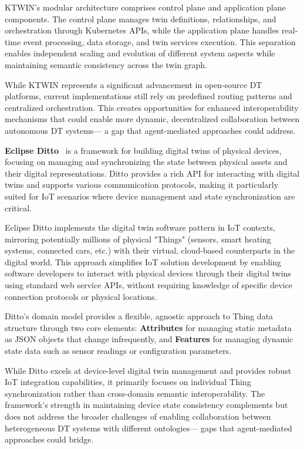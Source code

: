 KTWIN's modular architecture comprises control plane and application plane components.
The control plane manages twin definitions, relationships, and orchestration through Kubernetes APIs,
    while the application plane handles real-time event processing, data storage, and twin services execution.
This separation enables independent scaling and evolution of different system aspects while 
    maintaining semantic consistency across the twin graph.

While KTWIN represents a significant advancement in open-source DT platforms,
    current implementations still rely on predefined routing patterns and centralized orchestration.
This creates opportunities for enhanced interoperability mechanisms that could enable
    more dynamic, decentralized collaboration between autonomous DT systems—
    a gap that agent-mediated approaches could address.

\textbf{Eclipse Ditto}~\cite{eclipseEclipseDittoOpen2025}
    is a framework for building digital twins of physical devices,
    focusing on managing and synchronizing the state between physical assets and their digital representations.
Ditto provides a rich API for interacting with digital twins and supports various communication protocols,
    making it particularly suited for IoT scenarios where device management and state synchronization are critical.

Eclipse Ditto implements the digital twin software pattern in IoT contexts,
    mirroring potentially millions of physical "Things" (sensors, smart heating systems, connected cars, etc.)
    with their virtual, cloud-based counterparts in the digital world.
This approach simplifies IoT solution development by enabling software developers to interact with
    physical devices through their digital twins using standard web service APIs,
    without requiring knowledge of specific device connection protocols or physical locations.

Ditto's domain model provides a flexible, agnostic approach to Thing data structure through two core elements:
    \textbf{Attributes} for managing static metadata as JSON objects that change infrequently, and
    \textbf{Features} for managing dynamic state data such as sensor readings or configuration parameters.

While Ditto excels at device-level digital twin management and provides robust IoT integration capabilities,
    it primarily focuses on individual Thing synchronization rather than cross-domain semantic interoperability.
The framework's strength in maintaining device state consistency complements but does not address
    the broader challenges of enabling collaboration between heterogeneous DT systems with different ontologies—
    gaps that agent-mediated approaches could bridge.

